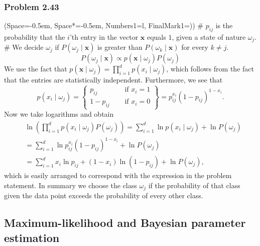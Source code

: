 \documentclass[12pt, a4paper]{article}
\newcommand{\listSpace}{-0.5em}%
\newcommand{\vect}[1]{\bm{#1}}
\begin{document}
\subsubsection*{Problem 2.43}
\begin{easylist}[enumerate]
	\ListProperties(Space=\listSpace, Space*=\listSpace, Numbers1=l, FinalMark1={)})
	# $p_{ij}$ is the probability that the $i$'th entry in the vector $\vect{x}$ equals $1$, given a state of nature $\omega_j$.
	# We decide $\omega_j$ if $P(\omega_j  \mid  \vect{x})$ is greater than $P(\omega_k  \mid  \vect{x})$ for every $k \neq j$.
	\begin{equation*}
	P(\omega_j  \mid  \vect{x}) \propto p(  \vect{x}  \mid  \omega_j) P(\omega_j)
	\end{equation*}
	We use the fact that $p(  \vect{x}  \mid  \omega_j) = \prod_{i = 1}^{d} p(  x_i \mid  \omega_j)$, which follows from the fact that the entries are statistically independent.
	Furthermore, we see that
	\begin{equation*}
	p(  x_i \mid  \omega_j) = 
	\left\{\!\begin{aligned}
	p_{ij} &\quad \text{ if } x_i = 1 \\
	1 - p_{ij} &\quad \text{ if } x_i = 0 
	\end{aligned}\right\} = 
	p_{ij}^{x_i} \left( 1 - p_{ij}\right)^{ 1 - x_i}.
	\end{equation*}
	Now we take logarithms and  obtain
	\begin{align*}
	& \ln \left( \prod_{i = 1}^{d} p(  x_i \mid  \omega_j) P(\omega_j) \right) =
	\sum_{i = 1}^{d} \ln p(  x_i \mid  \omega_j)  + \ln P(\omega_j) \\
	& = \sum_{i = 1}^{d} \ln p_{ij}^{x_i} \left( 1 - p_{ij}\right)^{ 1 - x_i}  + \ln P(\omega_j) \\
	&
	= \sum_{i = 1}^{d} x_i \ln p_{ij} + (1 - x_i) \ln ( 1 - p_{ij})  + \ln P(\omega_j),
	\end{align*}
	which is easily arranged to correspond with the expression in the problem statement. 
	In summary we choose the class $\omega_j$ if the probability of that class given the data point exceeds the probability of every other class.
\end{easylist}



\clearpage
\subsection{Maximum-likelihood and Bayesian parameter estimation}
\end{document}
